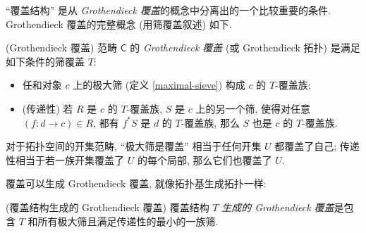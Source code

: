 
``覆盖结构'' 是从 \emph{Grothendieck 覆盖}的概念中分离出的一个比较重要的条件. Grothendieck 覆盖的完整概念 (用筛覆盖叙述) 如下.

\begin{definition}
	[label={Grothendieck-topology}]
	{(Grothendieck 覆盖)}
	范畴 $\mathsf C$ 的 \emph{Grothendieck 覆盖} (或 Grothendieck 拓扑) 是满足如下条件的筛覆盖 $T$:
	\begin{itemize}
		\item 任和对象 $c$ 上的极大筛 (定义 \ref{maximal-sieve}) 构成 $c$ 的 $T$-覆盖族;
		\item (传递性) 若 $R$ 是 $c$ 的 $T$-覆盖族, $S$ 是 $c$ 上的另一个筛, 使得对任意 $(f\colon d\to c)\in R$, 都有 $f^*S$ 是 $d$ 的 $T$-覆盖族, 那么 $S$ 也是 $c$ 的 $T$-覆盖族.
	\end{itemize}
\end{definition}

对于拓扑空间的开集范畴, ``极大筛是覆盖'' 相当于任何开集 $U$ 都覆盖了自己; 传递性相当于若一族开集覆盖了 $U$ 的每个局部, 那么它们也覆盖了 $U$.

%	

覆盖可以生成 Grothendieck 覆盖, 就像拓扑基生成拓扑一样:

\begin{definition}
	{(覆盖结构生成的 Grothendieck 覆盖)}
	覆盖结构 $T$ \emph{生成的 Grothendieck 覆盖}是包含 $T$ 和所有极大筛且满足传递性的最小的一族筛.
	
%		
\end{definition}


%

